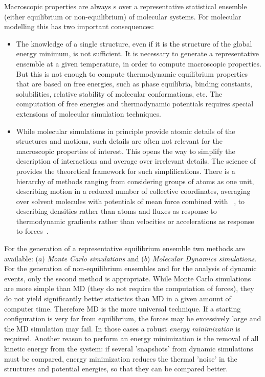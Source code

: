 Macroscopic properties are always s over a 
representative statistical ensemble (either equilibrium or 
non-equilibrium) of molecular systems. For molecular modelling this has 
two important consequences:
\begin{itemize}
\item   The knowledge of a single structure, even if it is the structure 
        of the global energy minimum, is not sufficient. It is necessary to 
        generate a representative ensemble at a given temperature, in order to 
        compute macroscopic properties. But this is not enough to compute 
        thermodynamic equilibrium properties that are based on free energies, 
        such as phase equilibria, binding constants, solubilities,  relative 
        stability of molecular conformations, etc. The computation of free 
        energies and thermodynamic potentials requires special extensions of 
        molecular simulation techniques.
\item   While molecular simulations in principle provide atomic details 
        of the structures and motions, such details are often not relevant for 
        the macroscopic properties of interest. This opens the way to simplify 
        the description of interactions and average over irrelevant details. 
        The science of  
        provides the theoretical framework 
        for such simplifications. There is a hierarchy of methods ranging from 
        considering groups of atoms as one unit, describing motion in a 
        reduced 
        number of collective coordinates, averaging over solvent molecules 
        with 
        potentials of mean force combined with 
        ~\cite{Gunsteren90}, to {\em 
        } 
        describing densities rather than atoms and fluxes 
        as response to thermodynamic gradients rather than velocities or 
        accelerations as response to forces~\cite{Fraaije93}.
\end{itemize}

For the generation of a representative equilibrium ensemble two methods 
are available: ($a$) {\em Monte Carlo simulations} and ($b$) {\em Molecular 
Dynamics simulations}. For the generation of non-equilibrium ensembles 
and for the analysis of dynamic events, only the second method is 
appropriate. While Monte Carlo simulations are more simple than MD (they 
do not require the computation of forces), they do not yield 
significantly better statistics than MD in a given amount of computer time. 
Therefore MD is the more universal technique. If a starting 
configuration is very far from equilibrium, the forces may be 
excessively large and the MD simulation may fail. In those cases a 
robust {\em energy minimization} is required. Another reason to perform 
an energy minimization is the removal of all kinetic energy from the 
system: if several 'snapshots' from dynamic simulations must be compared, 
energy minimization reduces the thermal 'noise' in the structures and  
potential energies,  so that they can be compared better.

